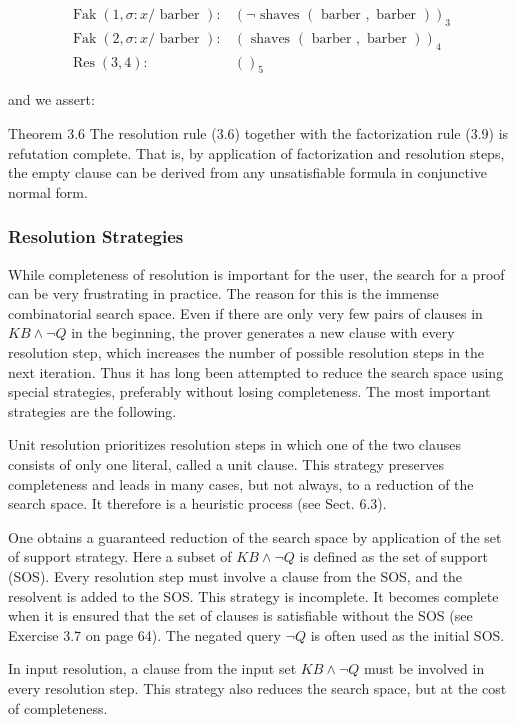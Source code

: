 \documentclass[10pt]{article}
\begin{document}
$$
\begin{aligned}
\operatorname{Fak}(1, \sigma: x / \text { barber }): & (\neg \text { shaves }(\text { barber }, \text { barber }))_{3} \\
\operatorname{Fak}(2, \sigma: x / \text { barber }): & (\text { shaves }(\text { barber }, \text { barber }))_{4} \\
\operatorname{Res}(3,4): & ()_{5}
\end{aligned}
$$

and we assert:

Theorem 3.6 The resolution rule (3.6) together with the factorization rule (3.9) is refutation complete. That is, by application of factorization and resolution steps, the empty clause can be derived from any unsatisfiable formula in conjunctive normal form.

\subsubsection*{Resolution Strategies}
While completeness of resolution is important for the user, the search for a proof can be very frustrating in practice. The reason for this is the immense combinatorial search space. Even if there are only very few pairs of clauses in $K B \wedge \neg Q$ in the beginning, the prover generates a new clause with every resolution step, which increases the number of possible resolution steps in the next iteration. Thus it has long been attempted to reduce the search space using special strategies, preferably without losing completeness. The most important strategies are the following.

Unit resolution prioritizes resolution steps in which one of the two clauses consists of only one literal, called a unit clause. This strategy preserves completeness and leads in many cases, but not always, to a reduction of the search space. It therefore is a heuristic process (see Sect. 6.3).

One obtains a guaranteed reduction of the search space by application of the set of support strategy. Here a subset of $K B \wedge \neg Q$ is defined as the set of support (SOS). Every resolution step must involve a clause from the SOS, and the resolvent is added to the SOS. This strategy is incomplete. It becomes complete when it is ensured that the set of clauses is satisfiable without the SOS (see Exercise 3.7 on page 64). The negated query $\neg Q$ is often used as the initial SOS.

In input resolution, a clause from the input set $K B \wedge \neg Q$ must be involved in every resolution step. This strategy also reduces the search space, but at the cost of completeness.
\end{document}
